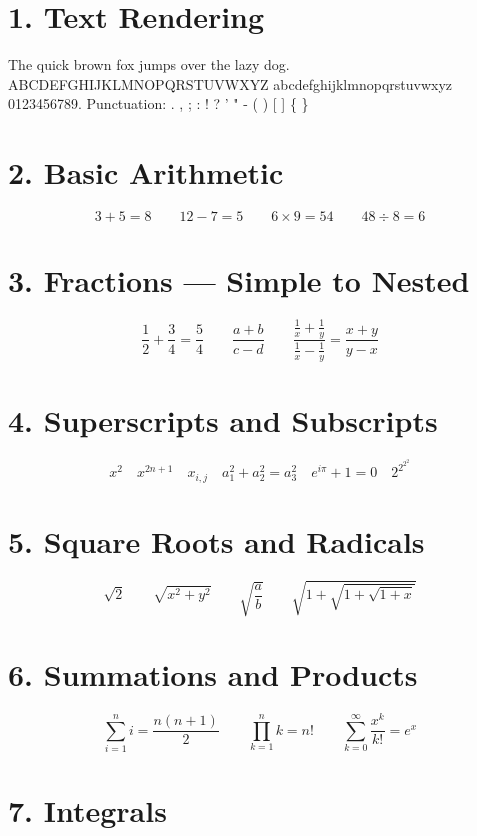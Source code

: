 \documentclass{article}
\begin{document}
\section*{1. Text Rendering}

The quick brown fox jumps over the lazy dog. ABCDEFGHIJKLMNOPQRSTUVWXYZ abcdefghijklmnopqrstuvwxyz 0123456789. Punctuation: . , ; : ! ? ' " - ( ) [ ] \{ \}

\section*{2. Basic Arithmetic}

\[ 3 + 5 = 8 \qquad 12 - 7 = 5 \qquad 6 \times 9 = 54 \qquad 48 \div 8 = 6 \]

\section*{3. Fractions --- Simple to Nested}

\[ \frac{1}{2} + \frac{3}{4} = \frac{5}{4} \qquad \frac{a+b}{c-d} \qquad \frac{\frac{1}{x} + \frac{1}{y}}{\frac{1}{x} - \frac{1}{y}} = \frac{x+y}{y-x} \]

\section*{4. Superscripts and Subscripts}

\[ x^2 \quad x^{2n+1} \quad x_{i,j} \quad a_1^2 + a_2^2 = a_3^2 \quad e^{i\pi} + 1 = 0 \quad 2^{2^{2^2}} \]

\section*{5. Square Roots and Radicals}

\[ \sqrt{2} \qquad \sqrt{x^2 + y^2} \qquad \sqrt{\frac{a}{b}} \qquad \sqrt{1 + \sqrt{1 + \sqrt{1 + x}}} \]

\section*{6. Summations and Products}

\[ \sum_{i=1}^{n} i = \frac{n(n+1)}{2} \qquad \prod_{k=1}^{n} k = n! \qquad \sum_{k=0}^{\infty} \frac{x^k}{k!} = e^x \]

\section*{7. Integrals}
\end{document}
